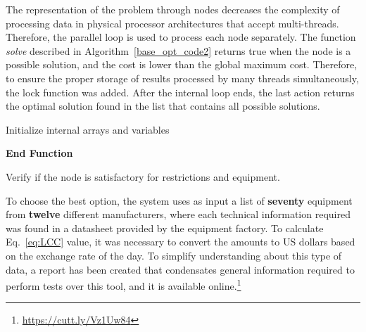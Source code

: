 \documentclass[10pt,journal,compsoc]{IEEEtran}
\begin{document}
The representation of the problem through nodes decreases the complexity of processing data in physical processor architectures that accept multi-threads. Therefore, the parallel loop is used to process each node separately. The function \textit{solve} described in Algorithm~\ref{base_opt_code2} returns true when the node is a possible solution, and the cost is lower than the global maximum cost. Therefore, to ensure the proper storage of results processed by many threads simultaneously, the lock function was added. After the internal loop ends, the last action returns the optimal solution found in the list that contains all possible solutions.

\begin{algorithm}[ht]
\SetAlgoLined
{}
 Initialize internal arrays and variables\;
 
\textbf{End Function}\;
\caption{Verify if the node is satisfactory for restrictions and equipment.}
\label{base_opt_code2}
\end{algorithm}

To choose the best option, the system uses as input a list of \textbf{seventy} equipment from \textbf{twelve} different manufacturers, where each technical information required was found in a datasheet provided by the equipment factory. To calculate Eq.~\eqref{eq:LCC} value, it was necessary to convert the amounts to US dollars based on the exchange rate of the day. To simplify understanding about this type of data, a report has been created that condensates general information required to perform tests over this tool, and it is available online.\footnote{\label{note1}\href{https://cutt.ly/Vz1Uw84}{https://cutt.ly/Vz1Uw84}}
\end{document}
